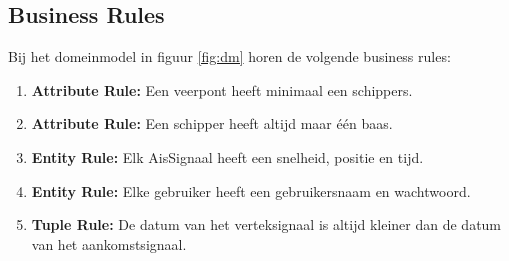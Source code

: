 \documentclass{article}
\begin{document}
\subsection{Business Rules}
Bij het domeinmodel in  figuur \ref{fig:dm} horen de volgende business rules:
\begin{enumerate}
    \item \textbf{Attribute Rule:} Een veerpont heeft minimaal een schippers.
    \item \textbf{Attribute Rule:} Een schipper heeft altijd maar één baas.
    \item \textbf{Entity Rule:} Elk AisSignaal heeft een snelheid, positie en tijd.
    \item \textbf{Entity Rule:} Elke gebruiker heeft een gebruikersnaam en wachtwoord.
    \item \textbf{Tuple Rule:} De datum van het verteksignaal is altijd kleiner dan de datum van het aankomstsignaal.
\end{enumerate} 
\end{document}
